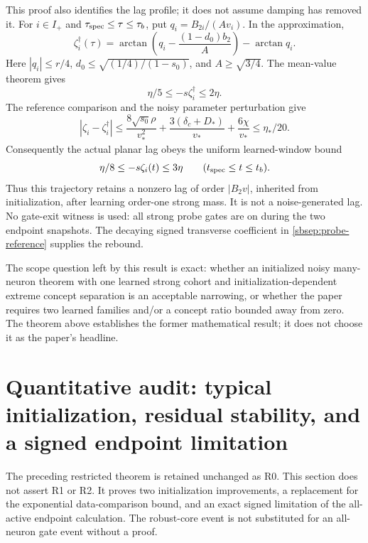 \documentclass{article} %
\theoremstyle{plain}
\theoremstyle{definition}
\theoremstyle{remark}
\begin{document}
This proof also identifies the lag profile; it does not assume damping
has removed it. For $i\in I_+$ and $\tau_{\rm spec}\le\tau\le\tau_b$,
put $q_i=B_{2i}/(Av_i)$. In the approximation,
\begin{equation}\label{sbsep:lag-profile}
 \zeta_i^\dagger(\tau)=
 \arctan\left(q_i-\frac{(1-d_0)b_2}{A}\right)-\arctan q_i.
\end{equation}
Here $|q_i|\le r/4$, $d_0\le\sqrt{(1/4)/(1-s_0)}$, and
$A\ge\sqrt{3/4}$. The mean-value theorem gives
\[
 \eta/5\le-s\zeta_i^\dagger\le2\eta.
\]
The reference comparison and the noisy parameter perturbation give
\[
 |\zeta_i-\zeta_i^\dagger|
 \le\frac{8\sqrt{s_0}\rho}{v_*^2}
       +\frac{3(\delta_c+D_*)}{v_*}+\frac{6\chi}{v_*}
 \le\eta_*/20.
\]
Consequently the actual planar lag obeys the uniform learned-window bound
\begin{equation}\label{sbsep:lag-lower}
 \eta/8\le-s\zeta_i(t)\le3\eta
 \qquad(t_{\rm spec}\le t\le t_b).
\end{equation}
Thus this trajectory retains a nonzero lag of order $|B_2v|$, inherited
from initialization, after learning order-one strong mass. It is not a
noise-generated lag. No gate-exit witness is used: all strong probe gates
are on during the two endpoint snapshots. The decaying signed transverse
coefficient in \eqref{sbsep:probe-reference} supplies the rebound.

The scope question left by this result is exact: whether an initialized
noisy many-neuron theorem with one learned strong cohort and
initialization-dependent extreme concept separation is an acceptable
narrowing, or whether the paper requires two learned families and/or a
concept ratio bounded away from zero. The theorem above establishes the
former mathematical result; it does not choose it as the paper's headline.

\section{Quantitative audit: typical initialization, residual stability, and a signed endpoint limitation}
\label{sbquant:scope}

The preceding restricted theorem is retained unchanged as R0. This section
does not assert R1 or R2. It proves two initialization improvements, a
replacement for the exponential data-comparison bound, and an exact signed
limitation of the all-active endpoint calculation. The robust-core event
is not substituted for an all-neuron gate event without a proof.
\end{document}

